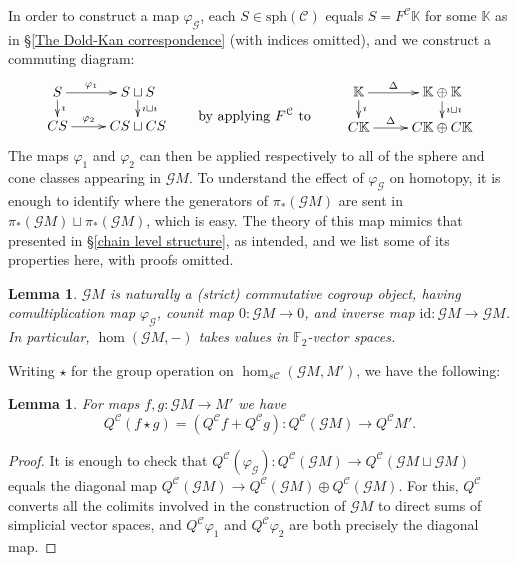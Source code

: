 \documentclass[11pt]{amsart} \renewcommand{\baselinestretch}{1.4}
\theoremstyle{plain}
\newtheorem{lem}[thm]{Lemma}
\theoremstyle{definition}
\newcommand{\DASH}{\mathrm{-}}
\let\phi\varphi
\renewcommand{\to}{\longrightarrow}
\newcommand{\scrG}{\mathscr{G}}
\newcommand{\calV}{\mathcal{V}}
\newcommand{\calc}{\mathcal{C}}
\newcommand{\spheres}[1]{\mathrm{sph}(#1)}
\newcommand{\vect}[2]{\calV^{#1}_{#2}}
\newcommand{\BSW}{{\scrG}}
\newcommand{\F}{\mathbb{F}}
\newcommand{\Id}{\mathrm{id}}
\newcommand{\Ftwo}{\F_2}
\begin{document}
\begin{Composite functor spectral sequences}
In order to construct a map $\phi_\BSW $, each $S\in\spheres{\calc}$ equals $S=F^\calc\mathbb{K}$ for some $\mathbb{K}$ as in \S\ref{The Dold-Kan correspondence} (with indices omitted), and we construct a commuting diagram:
\[\xymatrix@R=4mm{
S\ar[r]^-{\phi_1}
\ar[d]^-{\imath}
&%
S\sqcup S\ar[d]^-{\imath\sqcup\imath}
\\%
CS\ar[r]^-{\phi_2}
&%
CS\sqcup CS%
}\qquad \textup{\raisebox{-6mm}{by applying $F^\calc$ to }}\qquad \xymatrix@R=4mm{
\mathbb{K}\ar[r]^-{\Delta}
\ar[d]^-{\imath}
&%
\mathbb{K}\oplus \mathbb{K}\ar[d]^-{\imath\sqcup\imath}
\\%
C\mathbb{K}\ar[r]^-{\Delta}
&%
C\mathbb{K}\oplus C\mathbb{K}%
}\]
The maps $\phi_1$ and $\phi_2$ can then be applied respectively to all of the sphere and cone classes appearing in $\BSW M$.
To understand the effect of $\phi_{\BSW }$ on homotopy, it is enough to identify where the generators of $\pi_*(\BSW M)$ are sent in $\pi_*(\BSW M)\sqcup\pi_*(\BSW M)$, which is easy. The theory of this map mimics that presented in \S\ref{chain level structure}, as intended, and we list some of its properties here, with proofs omitted.
\begin{lem}
$\BSW M$ is naturally a (strict) commutative cogroup object, having comultiplication map $\phi_{\BSW }$, counit map $0:\BSW M\to 0$, and inverse map $\Id:\BSW M\to \BSW M$. In particular, $\hom(\BSW M,\DASH)$ takes values in $\ensuremath{\Ftwo }$-vector spaces.
\end{lem}
Writing $\star$ for the group operation on $\hom_{s\calc}(\BSW M,M')$, we have the following:
\begin{lem}
For maps $f,g:\BSW M\to M'$ we have 
\[Q^{\calc}(f\star g)=(Q^{\calc}f+Q^{\calc}g):Q^{\calc}(\BSW M)\to Q^{\calc}M'.\]
\end{lem}
\begin{proof}
It is enough to check that $Q^{\calc}(\phi_\BSW ):Q^{\calc}(\BSW M)\to Q^{\calc}(\BSW M\sqcup \BSW M)$ equals the diagonal map $Q^{\calc}(\BSW M)\to Q^{\calc}(\BSW M)\oplus Q^{\calc}(\BSW M)$. For this, $Q^{\calc}$ converts all the colimits involved in the construction of $\BSW M$ to direct sums of simplicial vector spaces, and $Q^{\calc}\phi_1$ and $Q^{\calc}\phi_2$ are both precisely the diagonal map.
\end{proof}


\end{Composite functor spectral sequences}
\end{document}
